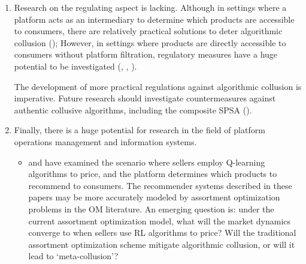 \documentclass[mnsc,nonblindrev]{workingpaper}
\begin{document}
\begin{enumerate}
\begin{itemize}
            Much of the analytical modeling research has focused on whether algorithmic collusion occurs by examining whether there exists a theoretical SPNE or MPE that supports the collusion (\cite{yang2023regulating}, \cite{miklos2019collusion}). However, the absence of a collusive equilibrium does not suggest there is no potential for algorithmic collusion (see \ref{subsec:remark} for more details.). It's important to have a framework that unifies the gap between the observed collusion and theoretical collusion.
            \item Future work could aim to provide more robust proofs of the convergence of Reinforcement Learning algorithms to collusive outcomes.
            \item \cite{meylahn2022learning} and \cite{loots2023data} present authentic collusive algorithms for duopoly markets; future research could explore the authentic collusive algorithms in oligopoly settings. Besides, current authentic collusive algorithms need to infer the opponent's demand information; future research could design collusive algorithms without relying on this channel.
        \end{itemize}

    \item Research on the regulating aspect is lacking. Although in settings where a platform acts as an intermediary to determine which products are accessible to consumers, there are relatively practical solutions to deter algorithmic collusion (\cite{johnson2023platform}); However, in settings where products are directly accessible to consumers without platform filtration, regulatory measures have a huge potential to be investigated (\cite{harrington2018developing}, \cite{abada2023artificial}, \cite{hartline2024regulation}). 

    The development of more practical regulations against algorithmic collusion is imperative. Future research should investigate countermeasures against authentic collusive algorithms, including the composite SPSA (\cite{meylahn2022learning}). 
        
    \item Finally, there is a huge potential for research in the field of platform operations management and information systems.
        \begin{itemize}
        \setlength{\itemsep}{0.7em}
            \item \cite{johnson2023platform} and \cite{xu2023algorithmic} have examined the scenario where sellers employ Q-learning algorithms to price, and the platform determines which products to recommend to consumers. The recommender systems described in these papers may be more accurately modeled by assortment optimization problems in the OM literature. An emerging question is: under the current assortment optimization model, what will the market dynamics converge to when sellers use RL algorithms to price? Will the traditional assortment optimization scheme mitigate algorithmic collusion, or will it lead to `meta-collusion'? 
            

\end{itemize}
\end{enumerate}
\end{document}
